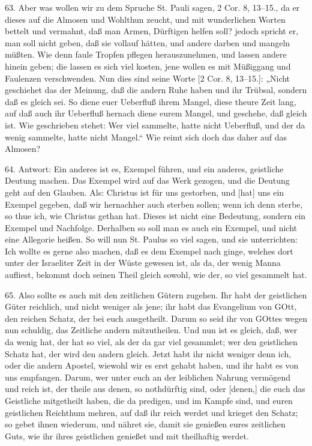 63. Aber was wollen wir zu dem Spruche St. Pauli sagen, 2 Cor. 8, 13–15., da er dieses auf die Almosen und Wohlthun zeucht, und mit wunderlichen Worten bettelt und vermahnt, daß man Armen, Dürftigen helfen soll? jedoch spricht er, man soll nicht geben, daß sie vollauf hätten, und andere darben und mangeln müßten. Wie denn faule Tropfen pflegen herauszunehmen, und lassen andere hinein geben; die lassen es sich viel kosten, jene wollen es mit Müßiggang und Faulenzen verschwenden. Nun dies sind seine Worte [2 Cor. 8, 13–15.]: „Nicht geschiehet das der Meinung, daß die andern Ruhe haben und ihr Trübsal, sondern daß es gleich sei. So diene euer Ueberfluß ihrem Mangel, diese theure Zeit lang, auf daß auch ihr Ueberfluß hernach diene eurem Mangel, und geschehe, daß gleich ist. Wie geschrieben stehet: Wer viel sammelte, hatte nicht Ueberfluß, und der da wenig sammelte, hatte nicht Mangel.“ Wie reimt sich doch das daher auf das Almosen?

64. Antwort: Ein anderes ist es, Exempel führen, und ein anderes, geistliche Deutung machen. Das Exempel wird auf das Werk gezogen, und die Deutung geht auf den Glauben. Als: Christus ist für uns gestorben, und [hat] uns ein Exempel gegeben, daß wir hernachher auch sterben sollen; wenn ich denn sterbe, so thue ich, wie Christus gethan hat. Dieses ist nicht eine Bedeutung, sondern ein Exempel und Nachfolge. Derhalben so soll man es auch ein Exempel, und nicht eine Allegorie heißen. So will nun St. Paulus so viel sagen, und sie unterrichten: Ich wollte es gerne also machen, daß es dem Exempel nach ginge, welches dort unter der Israeliter Zeit in der Wüste gewesen ist, als da, der wenig Manna aufliest, bekommt doch seinen Theil gleich sowohl, wie der, so viel gesammelt hat.

65. Also sollte es auch mit den zeitlichen Gütern zugehen. Ihr habt der geistlichen Güter reichlich, und nicht weniger als jene; ihr habt das Evangelium von GOtt, den reichen Schatz, der bei euch ausgetheilt. Darum so seid ihr von GOttes wegen nun schuldig, das Zeitliche andern mitzutheilen. Und nun ist es gleich, daß, wer da wenig hat, der hat so viel, als der da gar viel gesammlet; wer den geistlichen Schatz hat, der wird den andern gleich. Jetzt habt ihr nicht weniger denn ich, oder die andern Apostel, wiewohl wir es erst gehabt haben, und ihr habt es von uns empfangen. Darum, wer unter euch an der leiblichen Nahrung vermögend und reich ist, der theile aus denen, so nothdürftig sind, oder [denen,] die euch das Geistliche mitgetheilt haben, die da predigen, und im Kampfe sind, und euren geistlichen Reichthum mehren, auf daß ihr reich werdet und krieget den Schatz; so gebet ihnen wiederum, und nähret sie, damit sie genießen eures zeitlichen Guts, wie ihr ihres geistlichen genießet und mit theilhaftig werdet.

